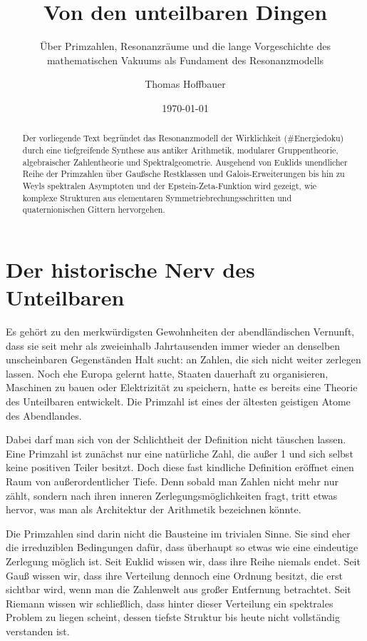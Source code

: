 \documentclass[11pt,a4paper]{scrartcl}
\title{\textbf{Von den unteilbaren Dingen}}
\subtitle{Über Primzahlen, Resonanzräume und die lange Vorgeschichte des mathematischen Vakuums als Fundament des Resonanzmodells}
\author{Thomas Hoffbauer}
\date{\today}
\begin{document}
\maketitle

\begin{abstract}
Der vorliegende Text begründet das Resonanzmodell der Wirklichkeit (\#Energiedoku) durch eine tiefgreifende Synthese aus antiker Arithmetik, modularer Gruppentheorie, algebraischer Zahlentheorie und Spektralgeometrie. Ausgehend von Euklids unendlicher Reihe der Primzahlen über Gaußsche Restklassen und Galois-Erweiterungen bis hin zu Weyls spektralen Asymptoten und der Epstein-Zeta-Funktion wird gezeigt, wie komplexe Strukturen aus elementaren Symmetriebrechungsschritten und quaternionischen Gittern hervorgehen.
\end{abstract}

\section{Der historische Nerv des Unteilbaren}

Es gehört zu den merkwürdigsten Gewohnheiten der abendländischen Vernunft, dass sie seit mehr als zweieinhalb Jahrtausenden immer wieder an denselben unscheinbaren Gegenständen Halt sucht: an Zahlen, die sich nicht weiter zerlegen lassen. Noch ehe Europa gelernt hatte, Staaten dauerhaft zu organisieren, Maschinen zu bauen oder Elektrizität zu speichern, hatte es bereits eine Theorie des Unteilbaren entwickelt. Die Primzahl ist eines der ältesten geistigen Atome des Abendlandes.

Dabei darf man sich von der Schlichtheit der Definition nicht täuschen lassen. Eine Primzahl ist zunächst nur eine natürliche Zahl, die außer 1 und sich selbst keine positiven Teiler besitzt. Doch diese fast kindliche Definition eröffnet einen Raum von außerordentlicher Tiefe. Denn sobald man Zahlen nicht mehr nur zählt, sondern nach ihren inneren Zerlegungsmöglichkeiten fragt, tritt etwas hervor, was man als Architektur der Arithmetik bezeichnen könnte.

Die Primzahlen sind darin nicht die Bausteine im trivialen Sinne. Sie sind eher die irreduziblen Bedingungen dafür, dass überhaupt so etwas wie eine eindeutige Zerlegung möglich ist. Seit Euklid wissen wir, dass ihre Reihe niemals endet. Seit Gauß wissen wir, dass ihre Verteilung dennoch eine Ordnung besitzt, die erst sichtbar wird, wenn man die Zahlenwelt aus großer Entfernung betrachtet. Seit Riemann wissen wir schließlich, dass hinter dieser Verteilung ein spektrales Problem zu liegen scheint, dessen tiefste Struktur bis heute nicht vollständig verstanden ist.
\end{document}
